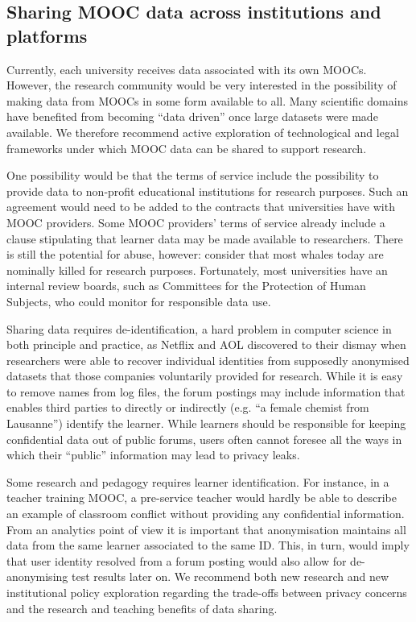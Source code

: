 \subsection{Sharing MOOC data across institutions and platforms}

Currently, each university receives data associated with its own MOOCs.
However, the research
community would be very interested in the possibility of making data
from MOOCs in some form available to all. Many scientific domains have
benefited from becoming ``data driven'' once large datasets were made
available.  We therefore recommend active exploration of technological
and legal frameworks under which MOOC data can be shared to support
research. 

One possibility would be that the terms of service include the
possibility to provide data to non-profit educational institutions for
research purposes. Such an agreement would need to be added to the
contracts that universities have with MOOC providers.
Some MOOC providers' terms of service already include a clause
stipulating that learner data may be made available to researchers.
There is still the potential for abuse, however: consider that most
whales today are nominally killed for research purposes.  Fortunately,
most 
universities have an internal review boards, such as Committees for the
Protection of Human Subjects, who could monitor for responsible data use.

Sharing data requires de-identification,
a hard problem in computer science in both principle and
practice, as Netflix and AOL discovered to their dismay when researchers
were able to recover individual identities from supposedly anonymised
datasets that those companies voluntarily provided for research.
While it is easy to remove names from log files, the forum
postings may include information that enables third parties to directly
or indirectly
(e.g. ``a female chemist from Lausanne'') identify the learner. 
While learners should be responsible for keeping confidential data out
of public forums, users often cannot foresee all the ways in which their
``public'' information may lead to 
privacy leaks.

Some research and pedagogy requires learner identification.
For instance, in a teacher training MOOC, a pre-service
teacher would hardly be able to describe an example of classroom
conflict without providing any confidential information. From an
analytics point of view it is important that anonymisation maintains all
data from the same learner associated to the same ID. This, in turn,
would imply that user identity resolved from a forum posting would also
allow for de-anonymising test results later on. 
We recommend both new
research and new institutional policy exploration regarding the
trade-offs between privacy concerns and 
the research and teaching benefits of data sharing.

